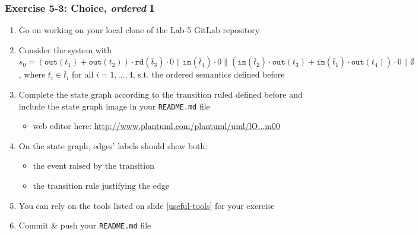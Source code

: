 \documentclass[handout]{beamer}\mode<presentation>{\usetheme{AMSCesenaBleu}}
\begin{document}
\begin{frame}
\frametitle{Exercise 5-3: Choice, \emph{ordered} I}
    \begin{enumerate}
        \item Go on working on your local clone of the Lab-5 GitLab repository
        
        \vfill
        
        \item Consider the system with \alert{$s_0 = (\mathtt{out}(t_1) + \mathtt{out}(t_2)) \cdot \mathtt{rd}(\bar{t}_3) \cdot 0 \parallel \mathtt{in}(\bar{t}_4) \cdot 0 \parallel (\mathtt{in}(\bar{t}_2) \cdot \mathtt{out}(t_3) + \mathtt{in}(\bar{t}_1) \cdot \mathtt{out}(t_4)) \cdot 0  \parallel \emptyset$}, where $t_i \in \bar{t}_i$ for all $i = 1,\ldots,4$, s.t. the \alert{ordered} \linda{} semantics defined before
        
        \vfill
    
        \item Complete the state graph according to the transition ruled defined before and include the state graph image in your \alert{\texttt{README.md}} file
        \begin{itemize}
            \item web editor here: \href{
                http://www.plantuml.com/plantuml/uml/lO_1JW8n48RlVOeviXB8mf4GGbmnUj43yOGS6ZfYGxVTj5CLZGSg9ho8R-DJx9EuiDeWuQgtQV_ld_-VeIDkoUUAkONK1RSyXpEyurxHkT4qbiy8tNHF71Cdt4cqL0YIk98pTznznNE4p7WhqR9xAH0mBsW90jtCoeAaqMpFwRQh0LuOm2cVBURMU2qoeupjzqTQI3qV3C0e-O37Y1kDJqKreQYe9Ifb7jahOvEJARHQ0t0fs-slXXuqZAS6bM6LG1E-vv0aRIiQzBakmrlIJg7SV83KzSVwy2CaxTfNiyqehA8GFUNcdRcqRj7fGSo-rPFiuleo6rMFQIIwaGW7nCy17VXzRG_-flUsP0pj_bzeO4FKmkVg2m00
            }{http://www.plantuml.com/plantuml/uml/lO...m00}
        \end{itemize}
        
        \vfill
        
        \item On the state graph, edges' labels should show both:
        \begin{itemize}
            \item the event raised by the transition
            \item the transition rule justifying the edge
        \end{itemize}
        
        \vfill
        
        \item You can rely on the tools listed on slide \ref{useful-tools} for your exercise
        
        \vfill
        
        \item Commit \& push your \texttt{README.md} file
        
    \end{enumerate}
    
\end{frame}
\end{document}
